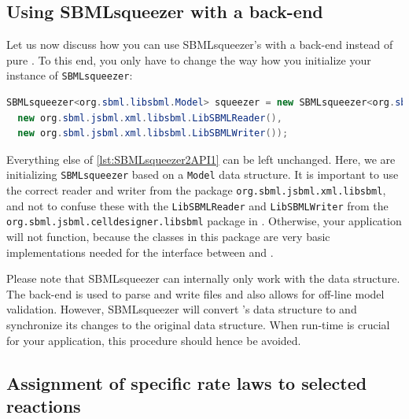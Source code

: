 \subsection{Using SBMLsqueezer with a \libSBML back-end}


Let us now discuss how you can use SBMLsqueezer's \API with a \libSBML back-end instead of pure \JSBML.
To this end, you only have to change the way how you initialize your instance of \texttt{SBMLsqueezer}:
\begin{lstlisting}[language=Java, numbers=none, caption={Initializing SBMLsqueezer 2.1 with a \libSBML back-end}]
SBMLsqueezer<org.sbml.libsbml.Model> squeezer = new SBMLsqueezer<org.sbml.libsbml.Model>(
  new org.sbml.jsbml.xml.libsbml.LibSBMLReader(),
  new org.sbml.jsbml.xml.libsbml.LibSBMLWriter());
\end{lstlisting}
Everything else of \vref{lst:SBMLsqueezer2API1} can be left unchanged.
Here, we are initializing \texttt{SBMLsqueezer} based on a \libSBML \texttt{Model} data structure.
It is important to use the correct reader and writer from the package \texttt{org.sbml.jsbml.xml.libsbml}, and not to confuse these with the \texttt{LibSBMLReader} and \texttt{LibSBMLWriter} from the \texttt{org.sbml.jsbml.celldesigner.libsbml} package in \JSBML.
Otherwise, your application will not function, because the classes in this package are very basic implementations needed for the interface between \JSBML and \CellDesigner.

Please note that SBMLsqueezer can internally only work with the \JSBML data structure.
The \libSBML back-end is used to parse and write \SBML files and also allows for off-line model validation.
However, SBMLsqueezer will convert \libSBML's data structure to \JSBML and synchronize its changes to the original data structure.
When run-time is crucial for your application, this procedure should hence be avoided.

\subsection{Assignment of specific rate laws to selected reactions}

